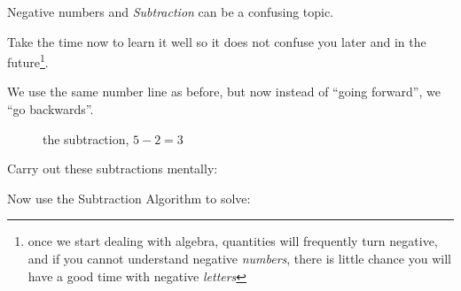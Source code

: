 Negative numbers and \emph{Subtraction} can be a confusing topic.

Take the time now to learn it well so it does not confuse you later and in the future\footnote{once we start dealing with algebra, quantities will frequently turn negative, and if you cannot understand negative \emph{numbers}, there is little chance you will have a good time with negative \emph{letters}}.

We use the same number line as before, but now instead of \enquote{going forward}, we \enquote{go backwards}.

\begin{figure}[ht]
    \centering
    \caption{the subtraction, $5 - 2 = 3$}
\end{figure}

\begin{examples}
    \begin{questions}
        \Question[3] Carry out these subtractions mentally:
        \begin{multicols}{3}
        \end{multicols}
        \Question[2] Now use the Subtraction Algorithm to solve:
    \end{questions}
\end{examples}

